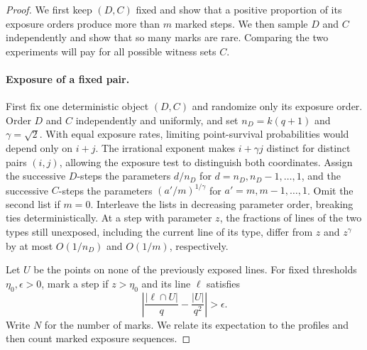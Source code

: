 \begin{proof}
We first keep $(D,C)$ fixed and show that a positive proportion of
its exposure orders produce more than $m$ marked steps. We then
sample $D$ and $C$ independently and show that so many marks are
rare. Comparing the two experiments will pay for all possible
witness sets $C$.

\paragraph{Exposure of a fixed pair.}
First fix one deterministic object $(D,C)$ and randomize only its
exposure order.  Order $D$ and $C$ independently and uniformly, and set
$n_D=k(q+1)$ and $\gamma=\sqrt2$.  With equal exposure rates, limiting
point-survival probabilities would depend only on $i+j$.
The irrational exponent makes
$i+\gamma j$ distinct for distinct pairs $(i,j)$, allowing the exposure
test to distinguish both coordinates.  Assign the successive $D$-steps the
parameters $d/n_D$ for $d=n_D,n_D-1,\ldots,1$, and the successive
$C$-steps the parameters $(a'/m)^{1/\gamma}$ for
$a'=m,m-1,\ldots,1$.  Omit the second list if $m=0$.  Interleave the lists
in decreasing parameter order, breaking ties deterministically.  At a
step with parameter $z$, the fractions of lines of the two types still
unexposed, including the current line of its type, differ from $z$ and
$z^\gamma$ by at most $O(1/n_D)$ and $O(1/m)$, respectively.

Let $U$ be the points on none of the previously exposed lines.  For
fixed thresholds $\eta_0,\epsilon>0$, mark a step if $z>\eta_0$ and its
line $\ell$ satisfies
\begin{equation}\label{eq:mark}
 \left|\frac{|\ell\cap U|}{q}-\frac{|U|}{q^2}\right|>\epsilon.
\end{equation}
Write $N$ for the number of marks.  We relate its expectation to the
profiles and then count marked exposure sequences.


\end{proof}
